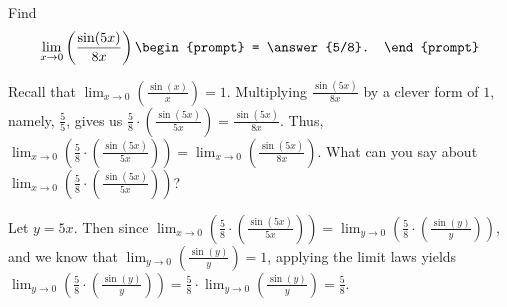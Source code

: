 \documentclass{ximera}
\author{Gregory Hartman \and Matthew Carr}
\begin{document}
\begin{exercise}



Find 
\[
\lim_{x\to0}\left({\frac{\sin(5x)}{8x}}\right)
\begin{prompt}
= \answer{5/8}.
\end{prompt}
\]

\begin{hint}
Recall that $\lim_{x\to0}\left({\frac{\sin(x)}{x}}\right)=1$. Multiplying $\frac{\sin(5x)}{8x}$ by a clever form of $1$, namely, $\frac{5}{5}$, gives us $\frac{5}{8}\cdot\left({\frac{\sin(5x)}{5x}}\right)=\frac{\sin(5x)}{8x}$. Thus, $\lim_{x\to0}\left({\frac{5}{8}\cdot\left({\frac{\sin(5x)}{5x}}\right)}\right)=\lim_{x\to0}\left({\frac{\sin(5x)}{8x}}\right)$. What can you say about $\lim_{x\to0}\left({\frac{5}{8}\cdot\left({\frac{\sin(5x)}{5x}}\right)}\right)$?
\end{hint}
\begin{hint}
Let $y=5x$. Then since $\lim_{x\to0}\left({\frac{5}{8}\cdot\left({\frac{\sin(5x)}{5x}}\right)}\right)=\lim_{y\to0}\left({\frac{5}{8}\cdot\left({\frac{\sin(y)}{y}}\right)}\right)$, and we know that $\lim_{y\to0}\left({\frac{\sin(y)}{y}}\right)=1$, applying the limit laws yields $\lim_{y\to0}\left({\frac{5}{8}\cdot\left({\frac{\sin(y)}{y}}\right)}\right)=\frac{5}{8}\cdot\lim_{y\to0}\left({\frac{\sin(y)}{y}}\right)=\frac{5}{8}$.
\end{hint}

\end{exercise}
\end{document}
